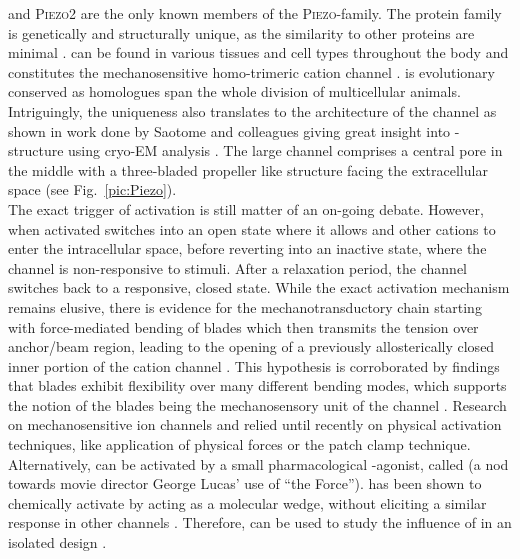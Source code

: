 \Piezo{} and \textsc{Piezo2} are the only known members of the \textsc{Piezo}-family. The protein family is genetically and structurally unique, as the similarity to other proteins are minimal \cite{Coste2010}. \Piezo{} can be found in various tissues and cell types throughout the body and constitutes the mechanosensitive homo-trimeric cation channel \Piezo{} \cite{Zhao2018}. \Piezo{} is evolutionary conserved as homologues span the whole division of multicellular animals. Intriguingly, the uniqueness also translates to the architecture of the channel as shown in work done by Saotome and colleagues giving great insight into \Piezo{}-structure using cryo-EM analysis \cite{Saotome2018}. The large channel comprises a central pore in the middle with a three-bladed propeller like structure facing the extracellular space (see Fig.~\ref{pic:Piezo}).\\
The exact trigger of activation is still matter of an on-going debate. However, when activated \Piezo{} switches into an open state where it allows \calcium{} and other cations to enter the intracellular space, before reverting into an inactive state, where the channel is non-responsive to stimuli. After a relaxation period, the channel switches back to a responsive, closed state. While the exact activation mechanism remains elusive, there is evidence for the mechanotransductory chain starting with force-mediated bending of blades which then transmits the tension over anchor/beam region, leading to the opening of a previously allosterically closed inner portion of the cation channel \cite{Zhao2018}. This hypothesis is corroborated by findings that blades exhibit flexibility over many different bending modes, which supports the notion of the blades being the mechanosensory unit of the channel \cite{Ge2015}.  Research on mechanosensitive ion channels and \Piezo{} relied until recently on physical activation techniques, like application of physical forces or the patch clamp technique. Alternatively, \Piezo{} can be activated by a small pharmacological \Piezo{}-agonist, called \Yoda{} (a nod towards movie director George Lucas’ use of “the Force”). \Yoda{} has been shown to chemically activate \Piezo{} by acting as a molecular wedge, without eliciting a similar response in other channels \cite{Lacroix2018, Syeda2015}. Therefore, \Yoda{} can be used to study the influence of \Piezo{} in an isolated design \cite{Botello-Smith2019}.


